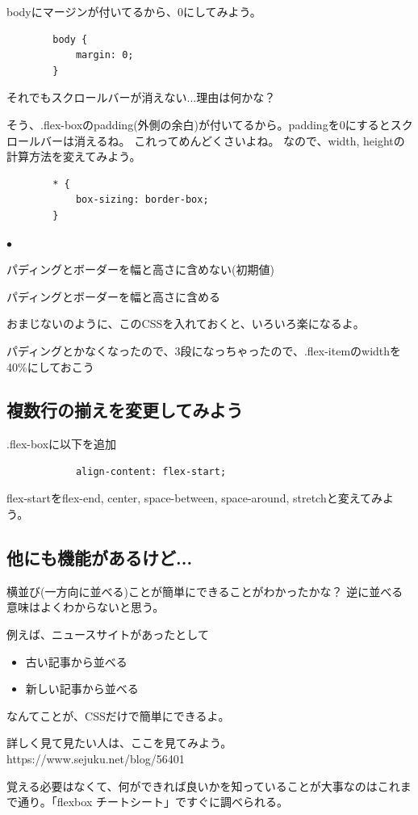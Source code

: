 \documentclass[mingoth,11pt,a4j,uplatex,dvipdfmx]{jsarticle}
\renewenvironment{description}%
{%
   \begin{list}{\parbox{1zw}{$\bullet$}}%
   {%
      \setlength{\topsep}{1zh}
      \setlength{\itemindent}{3zw}
      \setlength{\leftmargin}{5zw}%
      \setlength{\rightmargin}{0zw}%
      \setlength{\labelsep}{1zw}%
      \setlength{\labelwidth}{3zw}%
      \setlength{\itemsep}{0em}%
      \setlength{\parsep}{0em}%
      \setlength{\listparindent}{0zw}%
   }
}{%
   \end{list}%
}
\begin{document}
bodyにマージンが付いてるから、0にしてみよう。
\begin{lstlisting}
        body {
            margin: 0;
        }
\end{lstlisting}

それでもスクロールバーが消えない...理由は何かな？

そう、.flex-boxのpadding(外側の余白)が付いてるから。paddingを0にするとスクロールバーは消えるね。
これってめんどくさいよね。
なので、width, heightの計算方法を変えてみよう。
\begin{lstlisting}
        * {
            box-sizing: border-box;
        }
\end{lstlisting}
\begin{description}
\item[content-box] パディングとボーダーを幅と高さに含めない(初期値)
\item[border-box] パディングとボーダーを幅と高さに含める
\end{description}
おまじないのように、このCSSを入れておくと、いろいろ楽になるよ。

パディングとかなくなったので、3段になっちゃったので、.flex-itemのwidthを40\%にしておこう


\subsection{複数行の揃えを変更してみよう}
.flex-boxに以下を追加
\begin{lstlisting}
            align-content: flex-start;
\end{lstlisting}
flex-startをflex-end, center, space-between, space-around, stretchと変えてみよう。

\subsection{他にも機能があるけど...}
横並び(一方向に並べる)ことが簡単にできることがわかったかな？
逆に並べる意味はよくわからないと思う。

例えば、ニュースサイトがあったとして
\begin{itemize}
\item 古い記事から並べる
\item 新しい記事から並べる
\end{itemize}
なんてことが、CSSだけで簡単にできるよ。

詳しく見て見たい人は、ここを見てみよう。
https://www.sejuku.net/blog/56401

覚える必要はなくて、何ができれば良いかを知っていることが大事なのはこれまで通り。「flexbox チートシート」ですぐに調べられる。
\end{document}

